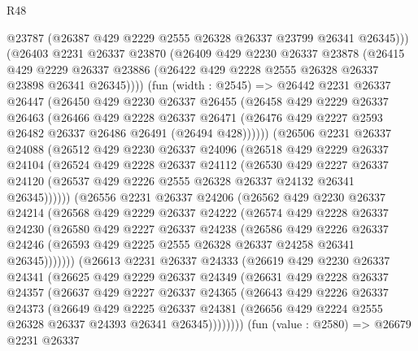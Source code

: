 \begin{lexlean}{R48}
\begin{coremodule}
        @23787
        (@26387 @429 @2229 @2555 @26328 @26337 @23799 @26341 @26345)))
    (@26403
      @2231
      @26337
      @23870
      (@26409
        @429
        @2230
        @26337
        @23878
        (@26415
          @429
          @2229
          @26337
          @23886
          (@26422 @429 @2228 @2555 @26328 @26337 @23898 @26341 @26345))))
    (fun (width : @2545) =>
    @26442
      @2231
      @26337
      @26447
      (@26450
        @429
        @2230
        @26337
        @26455
        (@26458
          @429
          @2229
          @26337
          @26463
          (@26466
            @429
            @2228
            @26337
            @26471
            (@26476 @429 @2227 @2593 @26482 @26337 @26486 @26491 (@26494 @428))))))
    (@26506
      @2231
      @26337
      @24088
      (@26512
        @429
        @2230
        @26337
        @24096
        (@26518
          @429
          @2229
          @26337
          @24104
          (@26524
            @429
            @2228
            @26337
            @24112
            (@26530
              @429
              @2227
              @26337
              @24120
              (@26537 @429 @2226 @2555 @26328 @26337 @24132 @26341 @26345))))))
    (@26556
      @2231
      @26337
      @24206
      (@26562
        @429
        @2230
        @26337
        @24214
        (@26568
          @429
          @2229
          @26337
          @24222
          (@26574
            @429
            @2228
            @26337
            @24230
            (@26580
              @429
              @2227
              @26337
              @24238
              (@26586
                @429
                @2226
                @26337
                @24246
                (@26593 @429 @2225 @2555 @26328 @26337 @24258 @26341 @26345)))))))
    (@26613
      @2231
      @26337
      @24333
      (@26619
        @429
        @2230
        @26337
        @24341
        (@26625
          @429
          @2229
          @26337
          @24349
          (@26631
            @429
            @2228
            @26337
            @24357
            (@26637
              @429
              @2227
              @26337
              @24365
              (@26643
                @429
                @2226
                @26337
                @24373
                (@26649
                  @429
                  @2225
                  @26337
                  @24381
                  (@26656 @429 @2224 @2555 @26328 @26337 @24393 @26341 @26345))))))))
    (fun (value : @2580) =>
    @26679
      @2231
      @26337

\end{coremodule}
\end{lexlean}
